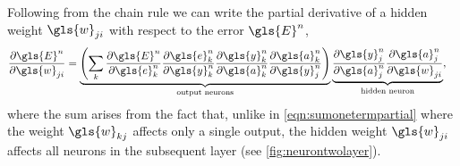 \documentclass[thesis]{subfiles}
\begin{document}
Following from the chain rule we can write the partial derivative of a hidden weight $\gls{w}_{ji}$ with respect to the error $\gls{E}^n$,
\begin{equation}
\begin{aligned}
    \frac{\partial \gls{E}^n}{\partial \gls{w}_{ji}} &= \underbrace{\left( \sum_k \frac{\partial \gls{E}^n}{\partial \gls{e}^n_{k}}
     \frac{\partial \gls{e}^n_{k}}{\partial \gls{y}^n_{k}} \frac{\partial \gls{y}^n_{k}}{\partial \gls{a}^n_k} \frac{\partial \gls{a}^n_k}{\partial \gls{y}^n_{j}}\right)}_\text{output neurons}
     \underbrace{\frac{\partial \gls{y}^n_{j}}{\partial \gls{a}^n_{j}} \frac{\partial \gls{a}^n_{j}}{\partial \gls{w}_{ji}}}_\text{hidden neuron},
     \label{eqn:twolayer1}
\end{aligned}
\end{equation}
%
where the sum arises from the fact that, unlike in \cref{eqn:sumonetermpartial} where the weight $\gls{w}_{kj}$ affects only a single output, the hidden weight $\gls{w}_{ji}$ affects all neurons in the subsequent layer (see \cref{fig:neurontwolayer}).
\end{document}
